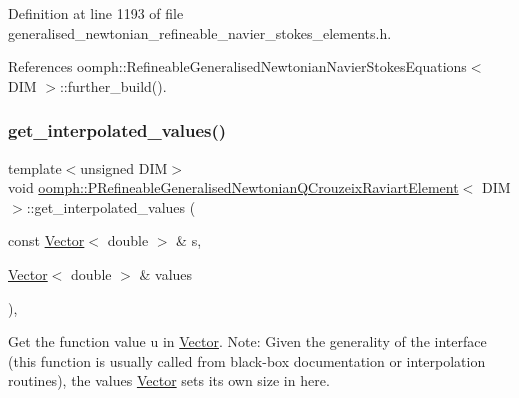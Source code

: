 Definition at line 1193 of file generalised\+\_\+newtonian\+\_\+refineable\+\_\+navier\+\_\+stokes\+\_\+elements.\+h.



References oomph\+::\+Refineable\+Generalised\+Newtonian\+Navier\+Stokes\+Equations$<$ D\+I\+M $>$\+::further\+\_\+build().

\mbox{\label{classoomph_1_1PRefineableGeneralisedNewtonianQCrouzeixRaviartElement_ae315f247e79d4520c6de82aa859d7237}} 
\subsubsection{\texorpdfstring{get\+\_\+interpolated\+\_\+values()}{get\_interpolated\_values()}\hspace{0.1cm}{\footnotesize\ttfamily [1/2]}}
{\footnotesize\ttfamily template$<$unsigned D\+IM$>$ \\
void \hyperlink{classoomph_1_1PRefineableGeneralisedNewtonianQCrouzeixRaviartElement}{oomph\+::\+P\+Refineable\+Generalised\+Newtonian\+Q\+Crouzeix\+Raviart\+Element}$<$ D\+IM $>$\+::get\+\_\+interpolated\+\_\+values (\begin{DoxyParamCaption}\item[{const \hyperlink{classoomph_1_1Vector}{Vector}$<$ double $>$ \&}]{s,  }\item[{\hyperlink{classoomph_1_1Vector}{Vector}$<$ double $>$ \&}]{values }\end{DoxyParamCaption})\hspace{0.3cm}{\ttfamily [inline]}, {\ttfamily [virtual]}}



Get the function value u in \hyperlink{classoomph_1_1Vector}{Vector}. Note\+: Given the generality of the interface (this function is usually called from black-\/box documentation or interpolation routines), the values \hyperlink{classoomph_1_1Vector}{Vector} sets its own size in here. 



